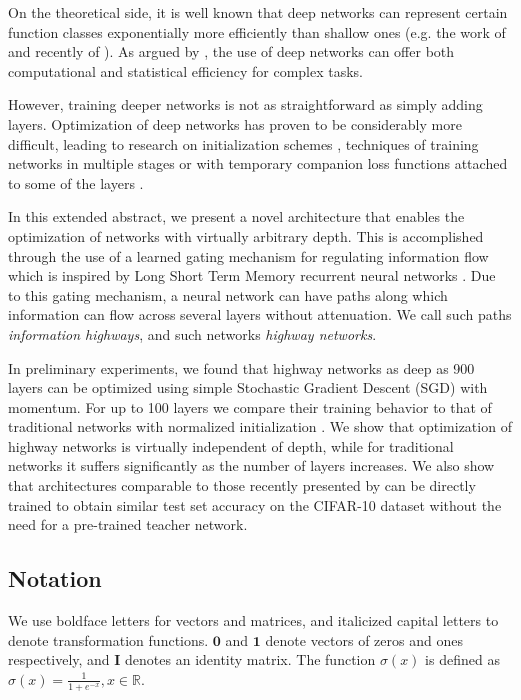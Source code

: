\documentclass{article}
\renewcommand{\vec}[1]{\mathbf{#1}}
\begin{document}
On the theoretical side, it is well known that deep networks can represent certain function classes exponentially more efficiently than shallow ones (e.g. the work of \citet{Hastad1987,Hastad1991} and recently of \citet{Montufar2014}). As argued by \citet{Bengio2013}, the use of deep networks can offer both computational and statistical efficiency for complex tasks.

However, training deeper networks is not as straightforward as simply adding layers. Optimization of deep networks has proven to be considerably more difficult, leading to research on initialization schemes \citep{Glorot2010,Saxe2013,He2015}, techniques of training networks in multiple stages \citep{Simonyan2014,Romero2014} or with temporary companion loss functions attached to some of the layers \citep{Szegedy2014,Lee2015}. 

In this extended abstract, we present a novel architecture that enables the optimization of networks with virtually arbitrary depth.
This is accomplished through the use of a learned gating mechanism for regulating information flow which is inspired by Long Short Term Memory recurrent neural networks \cite{Hochreiter1995}.
Due to this gating mechanism, a neural network can have paths along which information can flow across several layers without attenuation. We call such paths \emph{information highways}, and such networks \emph{highway networks}. 

In preliminary experiments, we found that highway networks as deep as 900 layers can be optimized using simple Stochastic Gradient Descent (SGD) with momentum. For up to 100 layers we compare their training behavior to that of traditional networks with normalized initialization \citep{Glorot2010,He2015}. We show that optimization of highway networks is virtually independent of depth, while for traditional networks it suffers significantly as the number of layers increases. We also show that architectures comparable to those recently presented by \citet{Romero2014} can be directly trained to obtain similar test set accuracy on the  CIFAR-10 dataset without the need for a pre-trained teacher network.

\subsection{Notation}
We use boldface letters for vectors and matrices, and italicized capital letters to denote transformation functions. $\mathbf{0}$ and $\mathbf{1}$ denote vectors of zeros and ones respectively, and $\vec{I}$ denotes an identity matrix. The function $\sigma(x)$ is defined as $\sigma(x) = \frac{1}{1+e^{-x}}, x \in \mathbb{R}$.
\end{document}
